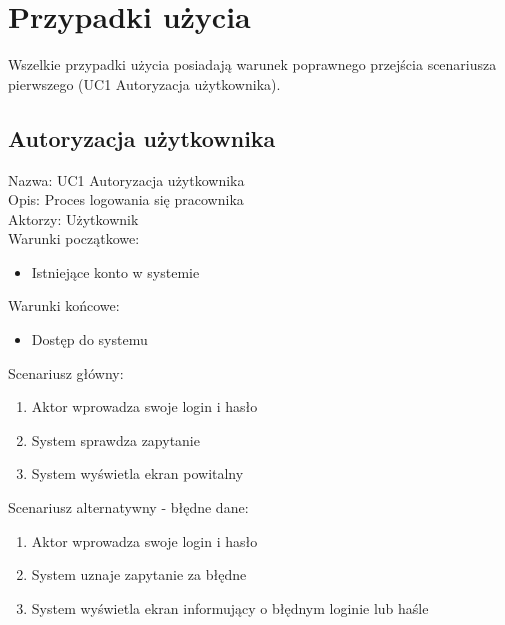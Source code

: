 \section{Przypadki użycia}

Wszelkie przypadki użycia posiadają warunek poprawnego przejścia scenariusza pierwszego (UC1 Autoryzacja użytkownika).

\subsection{Autoryzacja użytkownika} 
\begin{adjustwidth}{5em}{0pt}
Nazwa: UC1 Autoryzacja użytkownika \\
Opis: Proces logowania się pracownika \\
Aktorzy: Użytkownik \\
Warunki początkowe: 
\begin{itemize}
\item Istniejące konto w systemie 
\end{itemize}
Warunki końcowe: 
\begin{itemize}
\item Dostęp do systemu 
\end{itemize}
Scenariusz główny:
\begin{enumerate}
\item Aktor wprowadza swoje login i hasło
\item System sprawdza zapytanie
\item System wyświetla ekran powitalny
\end{enumerate}
Scenariusz alternatywny - błędne dane: 
\begin{enumerate}
\item Aktor wprowadza swoje login i hasło
\item System uznaje zapytanie za błędne
\item System wyświetla ekran informujący o błędnym loginie lub haśle 
\end{enumerate}
\end{adjustwidth}

